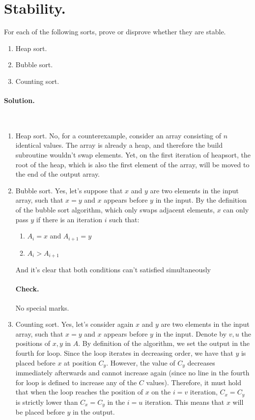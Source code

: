 \fi


 \section{Stability.} For each of the following sorts, prove or disprove whether they are stable.
 \begin{enumerate}
   \item Heap sort. 
   \item Bubble sort.
   \item Counting sort.
 \end{enumerate}

\ifdefined\SOLUTION
  \paragraph{Solution.} \\
\begin{enumerate}
  \item Heap sort. No, for a counterexample, consider an array consisting of $n$ identical values. The array is already a heap, and therefore the build subroutine wouldn't swap elements. Yet, on the first iteration of heapsort, the root of the heap, which is also the first element of the array, will be moved to the end of the output array.
  \item Bubble sort. Yes, let's suppose that $x$ and $y$ are two elements in the input array, such that $x = y$ and $x$ appears before $y$ in the input. By the definition of the bubble sort algorithm, which only swaps adjacent elements, $x$ can only pass $y$ if there is an iteration $i$ such that: \begin{enumerate}
      \item $A_{i}=x$ and $A_{i+1}=y$
      \item $A_{i} > A_{i+1}$ 
    \end{enumerate} And it's clear that both conditions can't satisfied simultaneously
\ifdefined\CHECK
  \paragraph{Check.} No special marks.
\fi
  \item Counting sort. Yes, let's consider again $x$ and $y$ are two elements in the input array, such that $x = y$ and $x$ appears before $y$ in the input. Denote by $v,u$ the positions of $x,y$ in $A$. By definition of the algorithm, we set the output in the fourth for loop. Since the loop iterates in decreasing order, we have that $y$ is placed before $x$ at position $C_{y}$. However, the value of $C_{y}$ decreases immediately afterwards and cannot increase again (since no line in the fourth for loop is defined to increase any of the $C$ values). Therefore, it must hold that when the loop reaches the position of $x$ on the $i = v$ iteration, $C_{x}=C_{y}$ is strictly lower than $C_{x}=C_{y}$ in the $i=u$ iteration. This means that $x$ will be placed before $y$ in the output.
 \end{enumerate}
\fi

